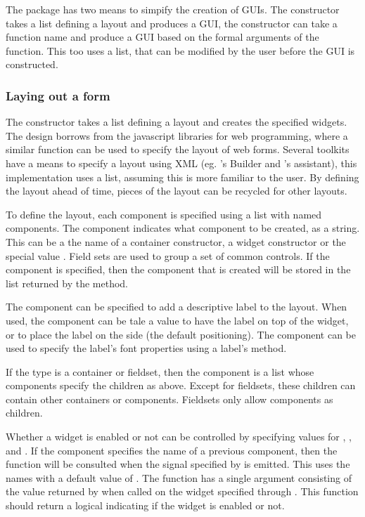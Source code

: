 The  package has two means to simpify the creation of
GUIs. The  constructor takes a list defining a
layout and produces a GUI, the  constructor can
take a function name and produce a GUI based on the formal arguments
of the function. This too uses a list, that can be modified by the
user before the GUI is constructed. 

\subsubsection{Laying out a form}
\label{sec:gWidgets-laying-out-form}

The  constructor takes a list defining a
layout and creates the specified widgets. The design borrows from the
 javascript libraries for web programming, where a similar
function can be used to specify the layout of web forms. Several
toolkits have a means to specify a layout using XML (eg. \GTK's
Builder and \QT's assistant), this implementation uses a list,
assuming this is more familiar to the \R\/ user. By defining the
layout ahead of time, pieces of the layout can be recycled for other
layouts.


To define the layout, each component is specified using a list with
named components. The component  indicates what component
to be created, as a string. This can be a the name of a container
constructor, a widget constructor or the special value
. Field sets are used to group a set of common
controls. If the component  is specified, then the
component that is created will be stored in the list returned by the
\code{[} method.

The  component can be specified to
add a descriptive label to the layout. When used, the component
 can be tale a value  to have the label
on top of the widget, or  to place the label on the side
(the default positioning). The  component can be used
to specify the label's font properties using a label's  method.

If the type is a container or fieldset, then the 
component is a list whose components specify the children as
above. Except for fieldsets, these children can contain other
containers or components. Fieldsets only allow components as children.

Whether a widget is enabled or not can be controlled by specifying
values for , , and
. If the component  specifies
the name of a previous component, then the function 
will be consulted when the signal specified by 
is emitted. This uses the  names with a default
value of . The  function has
a single argument consisting of the value returned by 
when called on the widget specified through . This
function should return a logical indicating if the widget is enabled
or not.

